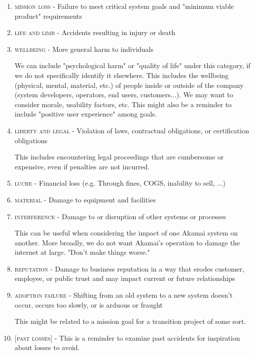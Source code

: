 \documentclass[letterpaper]{tufte-book}
\begin{document}
\begin{enumerate}
\setlength{\itemsep}{0pt}
\setlength{\parskip}{.25em}

\item \textsc{mission loss} - Failure to meet critical system goals and "minimum viable product" requirements
\item \textsc{life and limb} - Accidents resulting in injury or death
\item \textsc{wellbeing} - More general harm to individuals

We can include "psychological harm" or "quality of life" under this category, if we do not specifically identify it elsewhere.
This includes the wellbeing (physical, mental, material, etc.) of people inside or outside of the company (system developers, operators, end users, customers...). We may want to consider morale, usability factors, etc. This might also be a reminder to include "positive user experience" among goals.
\item \textsc{liberty and legal} - Violation of laws, contractual obligations, or certification obligations

This includes encountering legal proceedings that are cumbersome or expensive, even if penalties are not incurred.
\item \textsc{lucre} - Financial loss (e.g. Through fines, COGS, inability to sell, ...)
\item \textsc{material} - Damage to equipment and facilities
\item \textsc{interference} -  Damage to or disruption of other systems or processes

This can be useful when considering the impact of one Akamai system on another.
More broadly, we do not want Akamai's operation to damage the internet at large.
"Don't make things worse."
\item \textsc{reputation} - Damage to business reputation in a way that erodes customer, employee, or public trust and may impact current or future relationships
\item \textsc{adoption failure} - Shifting from an old system to a new system doesn't occur, occurs too slowly, or is arduous or fraught

This might be related to a mission goal for a transition project of some sort.
\item \textsc{[past losses]} - This is a reminder to examine past accidents for inspiration about losses to avoid.
\end{enumerate}  
 
\end{document}

